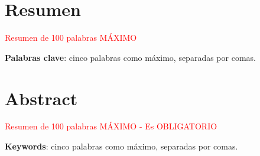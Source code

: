 \chapter{Resumen}
\textcolor{red}{Resumen de 100 palabras MÁXIMO}\\


\vspace{0.5cm}

\textbf{Palabras clave}: cinco palabras como máximo, separadas por comas.

\newpage
\thispagestyle{empty}
\hspace*{0.5cm}
\newpage

\chapter{Abstract}
\textcolor{red}{Resumen de 100 palabras MÁXIMO - Es OBLIGATORIO}\\

\vspace{0.5cm}

\textbf{Keywords}: cinco palabras como máximo, separadas por comas.
\newpage
\thispagestyle{empty}
\hspace*{0.5cm}
\newpage